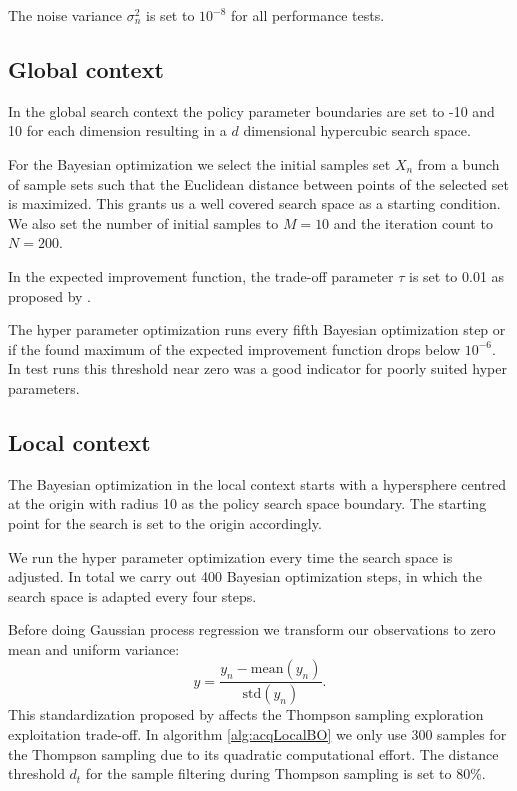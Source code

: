 The noise variance $\sigma_n^2$ is set to $10^{-8}$ for all performance tests.

\subsection{Global context}

In the global search context the policy parameter boundaries are set to -10 and 10 for each dimension resulting in a $d$ dimensional hypercubic search space.

For the Bayesian optimization we select the initial samples set $X_n$ from a bunch of sample sets such that the Euclidean distance between points of the selected set is maximized. This grants us a well covered search space as a starting condition. We also set the number of initial samples to $M = 10$ and the iteration count to $N = 200$.

In the expected improvement function, the trade-off parameter $\tau$ is set to 0.01 as proposed by \cite{brochu2010tutorial}.

The hyper parameter optimization runs every fifth Bayesian optimization step or if the found maximum of the expected improvement function drops below $10^{-6}$. In test runs this threshold near zero was a good indicator for poorly suited hyper parameters.

\subsection{Local context}
The Bayesian optimization in the local context starts with a hypersphere centred at the origin with radius 10 as the policy search space boundary. The starting point for the search is set to the origin accordingly.

We run the hyper parameter optimization every time the search space is adjusted. In total we carry out 400 Bayesian optimization steps, in which the search space is adapted every four steps.

Before doing Gaussian process regression we transform our observations to zero mean and uniform variance:
$$y = \frac{y_{n}-\mathrm{mean}(y_{n})}{\mathrm{std}(y_{n})}.$$
This standardization proposed by \cite{akrour2017local} affects the Thompson sampling exploration exploitation trade-off. In algorithm \ref{alg:acqLocalBO} we only use 300 samples for the Thompson sampling due to its quadratic computational effort. The distance threshold $d_t$  for the sample filtering during Thompson sampling is set to 80\%.
